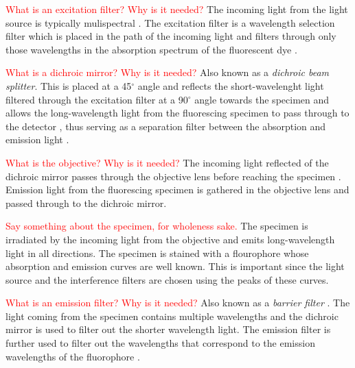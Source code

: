 \begin{definition}
	\textcolor{red}{What is an excitation filter? Why is it needed?}
	The incoming light from the light source is typically mulispectral \citep{SpringDavisdson2016}. 
	The excitation filter is a wavelength selection filter which is placed in the path of the incoming light and filters through only those wavelengths in the absorption spectrum of the fluorescent dye \citep{ThermoFisher2016,Danek2012,Hubeny2008,LichtmanConchello2005,Spring2003,CudeBurke2014,Fatima2008,Dobrucki2013}.
\end{definition}

\begin{definition}
	\textcolor{red}{What is a dichroic mirror? Why is it needed?}
	Also known as a \textit{dichroic beam splitter}.
	This is placed at a 45$^{\circ}$ angle and reflects the short-wavelenght light filtered through the excitation filter at a 90$^{\circ}$ angle towards the specimen \citep{Danek2012,Hubeny2008,Spring2003,CudeBurke2014} and allows the long-wavelength light from the fluorescing specimen to pass through to the detector \citep{LichtmanConchello2005,Koch1972}, thus serving as a separation filter between the absorption and emission light \citep{Fatima2008,Dobrucki2013}.
\end{definition}

\begin{definition}[Objective]
	\textcolor{red}{What is the objective? Why is it needed?}
	The incoming light reflected of the dichroic mirror passes through the objective lens before reaching the specimen \citep{Danek2012,Hubeny2008,LichtmanConchello2005,Spring2003}.
	Emission light from the fluorescing specimen is gathered in the objective lens and passed through to the dichroic mirror.
\end{definition}

\begin{definition}[Specimen]
	\textcolor{red}{Say something about the specimen, for wholeness sake.}
	The specimen is irradiated by the incoming light from the objective and emits long-wavelength light in all directions.
	The specimen is stained with a flourophore whose absorption and emission curves are well known.
	This is important since the light source and the interference filters are chosen using the peaks of these curves.
\end{definition}

\begin{definition}
	\textcolor{red}{What is an emission filter? Why is it needed?}
	Also known as a \textit{barrier filter} \citep{LichtmanConchello2005,Spring2003,Koch1972}.
	The light coming from the specimen contains multiple wavelengths and the dichroic mirror is used to filter out the shorter wavelength light.
	The emission filter is further  used to filter out the wavelengths that correspond to the emission wavelengths of the fluorophore \citep{CudeBurke2014,Danek2012,Hubeny2008,SpringDavisdson2016,ThermoFisher2016}.
\end{definition}

